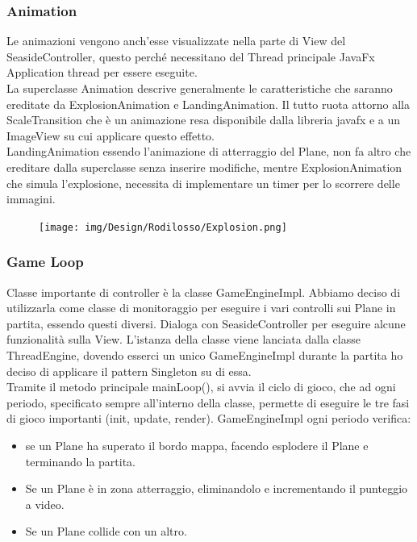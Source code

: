 \documentclass[a4paper,12pt]{report}
\begin{document}
\subsubsection{Animation}
Le animazioni vengono anch’esse visualizzate nella parte di View del SeasideController, questo perché necessitano del Thread principale 
JavaFx Application thread per essere eseguite.
\\
La superclasse Animation descrive generalmente le caratteristiche che saranno ereditate da ExplosionAnimation e LandingAnimation.
Il tutto ruota attorno alla ScaleTransition che è un animazione resa disponibile dalla libreria javafx e a un ImageView su cui applicare 
questo effetto.
\\
LandingAnimation essendo l’animazione di atterraggio del Plane, non fa altro che ereditare dalla superclasse senza inserire modifiche, 
mentre ExplosionAnimation che simula l’explosione, necessita di implementare un timer per lo scorrere delle immagini.
\begin{figure}[H]
    \begin{center}
        \centering
        \texttt{[image: img/Design/Rodilosso/Explosion.png]}
    \end{center}
    \label{img:explosion}
\end{figure}

\subsubsection{Game Loop}
Classe importante di controller è la classe GameEngineImpl.
Abbiamo deciso di utilizzarla come classe di monitoraggio per eseguire i vari controlli sui Plane in partita, essendo questi diversi.
Dialoga con SeasideController per eseguire alcune funzionalità sulla View.
L’istanza della classe viene lanciata dalla classe ThreadEngine, dovendo esserci un unico GameEngineImpl durante la partita ho deciso 
di applicare il pattern Singleton su di essa.
\\
Tramite il metodo principale mainLoop(), si avvia il ciclo di gioco, che ad ogni periodo, specificato sempre all’interno della classe, 
permette di eseguire le tre fasi di gioco importanti (init, update, render).
GameEngineImpl ogni periodo verifica:
\begin{itemize}
	\item se un Plane ha superato il bordo mappa, facendo esplodere il Plane e terminando la partita.
	\item Se un Plane è in zona atterraggio, eliminandolo e incrementando il punteggio a video.
	\item Se un Plane collide con un altro.
\end{itemize}
\end{document}
